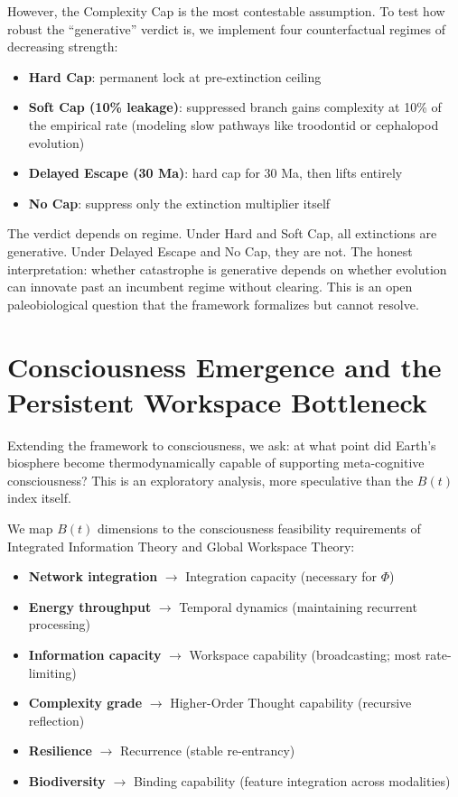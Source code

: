 However, the Complexity Cap is the most contestable assumption. To test how robust the ``generative'' verdict is, we implement four counterfactual regimes of decreasing strength:

\begin{itemize}
\item \textbf{Hard Cap}: permanent lock at pre-extinction ceiling
\item \textbf{Soft Cap (10\% leakage)}: suppressed branch gains complexity at 10\% of the empirical rate (modeling slow pathways like troodontid or cephalopod evolution)
\item \textbf{Delayed Escape (30 Ma)}: hard cap for 30 Ma, then lifts entirely
\item \textbf{No Cap}: suppress only the extinction multiplier itself
\end{itemize}

The verdict depends on regime. Under Hard and Soft Cap, all extinctions are generative. Under Delayed Escape and No Cap, they are not. The honest interpretation: whether catastrophe is generative depends on whether evolution can innovate past an incumbent regime without clearing. This is an open paleobiological question that the framework formalizes but cannot resolve.

\section{Consciousness Emergence and the Persistent Workspace Bottleneck}

Extending the framework to consciousness, we ask: at what point did Earth's biosphere become thermodynamically capable of supporting meta-cognitive consciousness? This is an exploratory analysis, more speculative than the $B(t)$ index itself.

We map $B(t)$ dimensions to the consciousness feasibility requirements of Integrated Information Theory and Global Workspace Theory:
\begin{itemize}
\item \textbf{Network integration} $\to$ Integration capacity (necessary for $\Phi$)
\item \textbf{Energy throughput} $\to$ Temporal dynamics (maintaining recurrent processing)
\item \textbf{Information capacity} $\to$ Workspace capability (broadcasting; most rate-limiting)
\item \textbf{Complexity grade} $\to$ Higher-Order Thought capability (recursive reflection)
\item \textbf{Resilience} $\to$ Recurrence (stable re-entrancy)
\item \textbf{Biodiversity} $\to$ Binding capability (feature integration across modalities)
\end{itemize}

